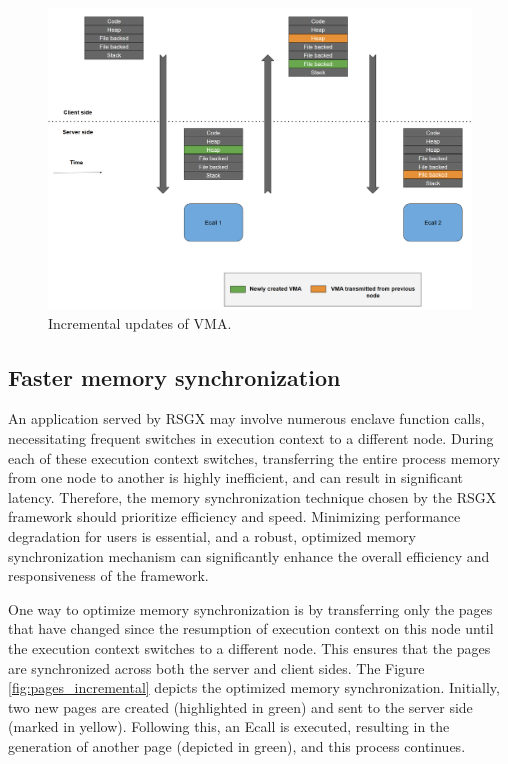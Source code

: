 \documentclass[article, doublespace,nopageskip]{VTthesis} %
\newcommand{\monitor}{RSGX \xspace}
\begin{document}
    \begin{figure}[htb]
	    \centering
		\includegraphics[scale=0.7]{figures/incremental_vmas.png}
		\caption{Incremental updates of VMA.} 
		\label{fig:vmas_incremental}
	\end{figure}

    \subsection{Faster memory synchronization}
    An application served by \monitor may involve numerous enclave function calls, necessitating frequent switches in execution context to a different node. During each of these execution context switches, transferring the entire process memory from one node to another is highly inefficient, and can result in significant latency. Therefore, the memory synchronization technique chosen by the \monitor framework should prioritize efficiency and speed. Minimizing performance degradation for users is essential, and a robust, optimized memory synchronization mechanism can significantly enhance the overall efficiency and responsiveness of the framework.

    One way to optimize memory synchronization is by transferring only the pages that have changed since the resumption of execution context on this node until the execution context switches to a different node. This ensures that the pages are synchronized across both the server and client sides. The Figure \ref{fig:pages_incremental} depicts the optimized memory synchronization. Initially, two new pages are created (highlighted in green) and sent to the server side (marked in yellow). Following this, an Ecall is executed, resulting in the generation of another page (depicted in green), and this process continues.
\end{document}

